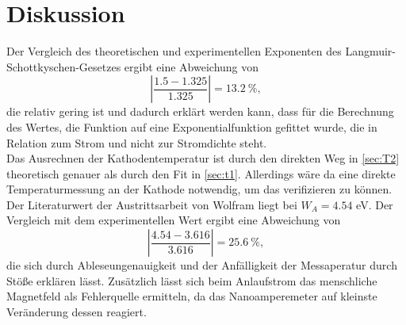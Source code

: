 \section{Diskussion}
\label{sec:Diskussion}
Der Vergleich des theoretischen und experimentellen Exponenten des Langmuir-Schottkyschen-Gesetzes ergibt eine Abweichung von
\begin{equation*}
  |\frac{1.5-1.325}{1.325}|=13.2\ \%,
\end{equation*}
die relativ gering ist und dadurch erklärt werden kann, dass für die Berechnung des Wertes, die Funktion auf eine Exponentialfunktion gefittet wurde, die in Relation zum Strom und nicht zur Stromdichte steht.\\
Das Ausrechnen der Kathodentemperatur ist durch den direkten Weg in \autoref{sec:T2} theoretisch genauer als durch den Fit in \autoref{sec:t1}. Allerdings wäre da eine direkte Temperaturmessung an der Kathode notwendig, um das verifizieren zu können.\\
Der Literaturwert der Austrittsarbeit von Wolfram liegt bei $W_{A}=4.54$ eV. Der Vergleich mit dem experimentellen Wert ergibt eine Abweichung von
\begin{equation*}
  |\frac{4.54-3.616}{3.616}|=25.6\ \%,
\end{equation*}
die sich durch Ableseungenauigkeit und der Anfälligkeit der Messaperatur durch Stöße erklären lässt. Zusätzlich lässt sich beim Anlaufstrom das menschliche Magnetfeld als Fehlerquelle ermitteln, da das Nanoamperemeter auf kleinste Veränderung dessen reagiert.
